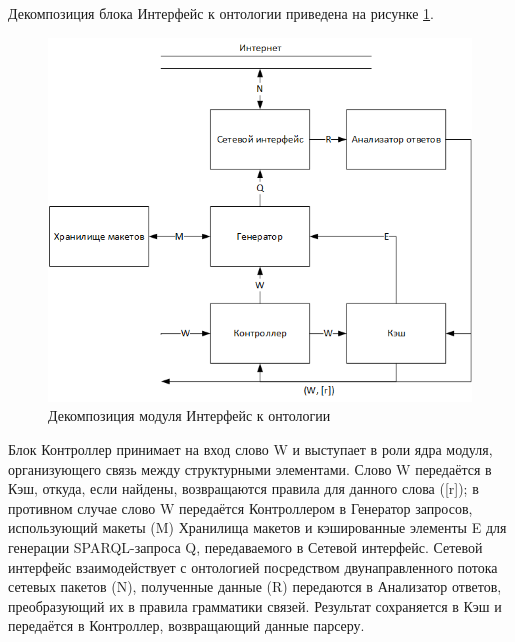 Декомпозиция блока Интерфейс к онтологии приведена на рисунке \ref{fig:decomposedstruct}.

\begin{figure}[H]
	\centering
		\includegraphics[scale=1.0]{images/decomposedstructure.png}
	\caption{\small Декомпозиция модуля Интерфейс к онтологии}
	\label{fig:decomposedstruct}
\end{figure}

Блок Контроллер принимает на вход слово W и выступает в роли ядра модуля, организующего связь между структурными элементами. Слово W передаётся в Кэш, откуда, если найдены, возвращаются правила для данного слова ([r]); в противном случае слово W передаётся Контроллером в Генератор запросов, использующий макеты (M) Хранилища макетов и кэшированные элементы E для генерации SPARQL-запроса Q, передаваемого в Сетевой интерфейс. Сетевой интерфейс взаимодействует с онтологией посредством двунаправленного потока сетевых пакетов (N), полученные данные (R) передаются в Анализатор ответов, преобразующий их в правила грамматики связей. Результат сохраняется в Кэш и передаётся в  Контроллер, возвращающий данные парсеру.


